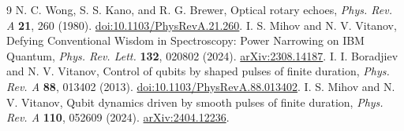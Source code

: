 \documentclass[11pt]{article}
\begin{document}
\begin{thebibliography}{9}
 N. C. Wong, S. S. Kano, and R. G. Brewer,
Optical rotary echoes, \emph{Phys. Rev. A} \textbf{21}, 260 (1980).
\href{https://doi.org/10.1103/PhysRevA.21.260}{doi:10.1103/PhysRevA.21.260}.
 I. S. Mihov and N. V. Vitanov,
Defying Conventional Wisdom in Spectroscopy: Power Narrowing on IBM Quantum,
\emph{Phys. Rev. Lett.} \textbf{132}, 020802 (2024).
\href{https://arxiv.org/abs/2308.14187}{arXiv:2308.14187}.
 I. I. Boradjiev and N. V. Vitanov,
Control of qubits by shaped pulses of finite duration,
\emph{Phys. Rev. A} \textbf{88}, 013402 (2013).
\href{https://doi.org/10.1103/PhysRevA.88.013402}{doi:10.1103/PhysRevA.88.013402}.
 I. S. Mihov and N. V. Vitanov,
Qubit dynamics driven by smooth pulses of finite duration,
\emph{Phys. Rev. A} \textbf{110}, 052609 (2024).
\href{https://arxiv.org/abs/2404.12236}{arXiv:2404.12236}.
\end{thebibliography}
\end{document}
